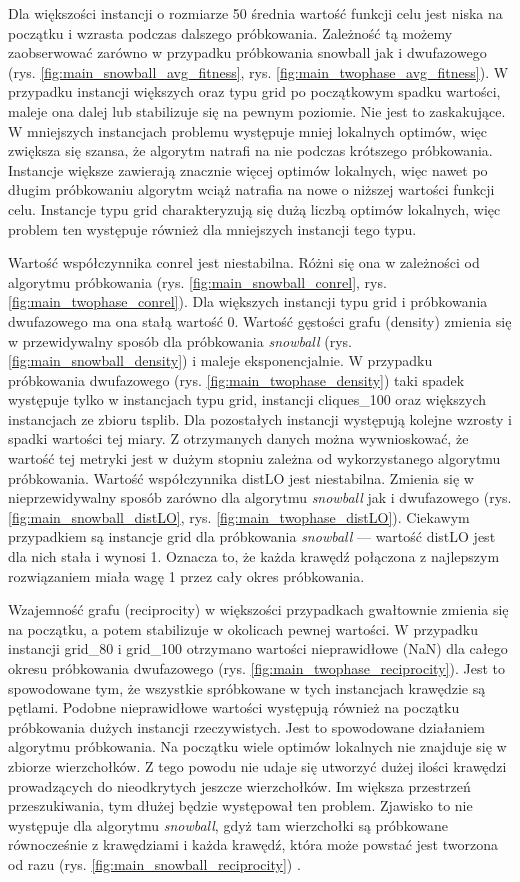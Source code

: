 Dla większości instancji o rozmiarze 50 średnia wartość funkcji celu jest niska na początku i wzrasta podczas dalszego próbkowania.
Zależność tą możemy zaobserwować zarówno w przypadku próbkowania snowball jak i dwufazowego (rys. \ref{fig:main_snowball_avg_fitness}, rys. \ref{fig:main_twophase_avg_fitness}).
W przypadku instancji większych oraz typu grid po początkowym spadku wartości, maleje ona dalej lub stabilizuje się na pewnym poziomie.
Nie jest to zaskakujące. W mniejszych instancjach problemu występuje mniej lokalnych optimów, więc zwiększa się szansa, że algorytm
natrafi na nie podczas krótszego próbkowania. Instancje większe zawierają znacznie więcej optimów lokalnych, więc nawet po długim próbkowaniu
algorytm wciąż natrafia na nowe o niższej wartości funkcji celu. Instancje typu grid charakteryzują się dużą liczbą optimów lokalnych,
więc problem ten występuje również dla mniejszych instancji tego typu.

Wartość współczynnika conrel jest niestabilna. Różni się ona w zależności od algorytmu próbkowania (rys. \ref{fig:main_snowball_conrel}, rys. \ref{fig:main_twophase_conrel}).
Dla większych instancji typu grid i próbkowania dwufazowego ma ona stałą wartość 0.
Wartość gęstości grafu (density) zmienia się w przewidywalny sposób dla próbkowania \textit{snowball} (rys. \ref{fig:main_snowball_density}) i maleje eksponencjalnie.
W przypadku próbkowania dwufazowego (rys. \ref{fig:main_twophase_density}) taki spadek występuje tylko w instancjach typu grid, instancji cliques\_100 oraz większych
instancjach ze zbioru tsplib.
Dla pozostałych instancji występują kolejne wzrosty i spadki wartości tej miary.
Z otrzymanych danych można wywnioskować, że wartość tej metryki jest w dużym stopniu zależna od wykorzystanego algorytmu próbkowania.
Wartość współczynnika distLO jest niestabilna. Zmienia się w nieprzewidywalny sposób zarówno dla algorytmu \textit{snowball} jak i dwufazowego (rys. \ref{fig:main_snowball_distLO}, rys. \ref{fig:main_twophase_distLO}).
Ciekawym przypadkiem są instancje grid dla próbkowania \textit{snowball} --- wartość distLO jest dla nich stała i wynosi 1. Oznacza to, że każda krawędź połączona
z najlepszym rozwiązaniem miała wagę 1 przez cały okres próbkowania.

Wzajemność grafu (reciprocity) w większości przypadkach gwałtownie zmienia się na początku, a potem stabilizuje w okolicach pewnej wartości.
W przypadku instancji grid\_80 i grid\_100 otrzymano wartości nieprawidłowe (NaN) dla całego okresu próbkowania dwufazowego (rys. \ref{fig:main_twophase_reciprocity}).
Jest to spowodowane tym, że wszystkie spróbkowane w tych instancjach krawędzie są pętlami.
Podobne nieprawidłowe wartości występują również na początku próbkowania dużych instancji rzeczywistych.
Jest to spowodowane działaniem algorytmu próbkowania. Na początku wiele optimów lokalnych nie znajduje się w zbiorze wierzchołków.
Z tego powodu nie udaje się utworzyć dużej ilości krawędzi prowadzących do nieodkrytych jeszcze wierzchołków.
Im większa przestrzeń przeszukiwania, tym dłużej będzie występował ten problem.
Zjawisko to nie występuje dla algorytmu \textit{snowball}, gdyż tam wierzchołki są próbkowane równocześnie z krawędziami i każda krawędź, która może powstać jest
tworzona od razu (rys. \ref{fig:main_snowball_reciprocity}) .

